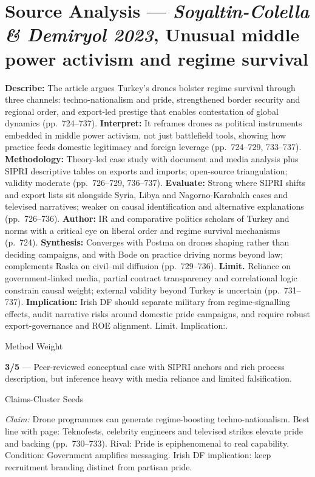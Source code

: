 \section*{Source Analysis — \textit{Soyaltin\hyp Colella & Demiryol 2023}, Unusual middle power activism and regime survival}
\textbf{Describe:} The article argues Turkey’s drones bolster regime survival through three channels: techno\hyp nationalism and pride, strengthened border security and regional order, and export\hyp led prestige that enables contestation of global dynamics (pp.~724–737).
\textbf{Interpret:} It reframes drones as political instruments embedded in middle power activism, not just battlefield tools, showing how practice feeds domestic legitimacy and foreign leverage (pp.~724–729, 733–737).
\textbf{Methodology:} Theory\hyp led case study with document and media analysis plus SIPRI descriptive tables on exports and imports; open\hyp source triangulation; validity moderate (pp.~726–729, 736–737).
\textbf{Evaluate:} Strong where SIPRI shifts and export lists sit alongside Syria, Libya and Nagorno\hyp Karabakh cases and televised narratives; weaker on causal identification and alternative explanations (pp.~726–736).
\textbf{Author:} IR and comparative politics scholars of Turkey and norms with a critical eye on liberal order and regime survival mechanisms (p.~724).
\textbf{Synthesis:} Converges with Postma on drones shaping rather than deciding campaigns, and with Bode on practice driving norms beyond law; complements Raska on civil–mil diffusion (pp.~729–736).
\textbf{Limit.} Reliance on government\hyp linked media, partial contract transparency and correlational logic constrain causal weight; external validity beyond Turkey is uncertain (pp.~731–737).
\textbf{Implication:} Irish DF should separate military from regime\hyp signalling effects, audit narrative risks around domestic pride campaigns, and require robust export\hyp governance and ROE alignment. Limit. Implication:.

Method Weight

\textbf{3/5} — Peer\hyp reviewed conceptual case with SIPRI anchors and rich process description, but inference heavy with media reliance and limited falsification.

Claims-Cluster Seeds

\textit{Claim:} Drone programmes can generate regime\hyp boosting techno\hyp nationalism.
Best line with page: Teknofests, celebrity engineers and televised strikes elevate pride and backing (pp.~730–733). Rival: Pride is epiphenomenal to real capability. Condition: Government amplifies messaging. Irish DF implication: keep recruitment branding distinct from partisan pride.

